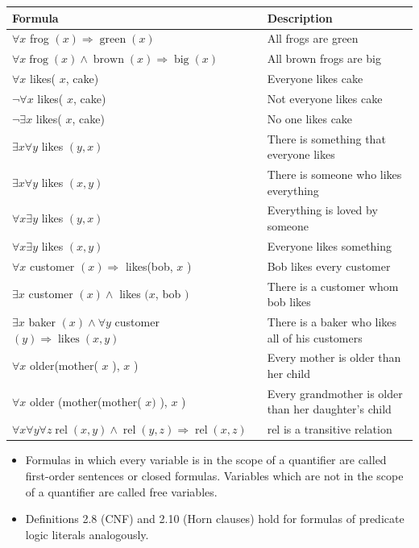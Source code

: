\documentclass[10pt]{book}
\begin{document}
\begin{center}
\begin{tabular}{|l|l|}
\hline
Formula & Description \\
\hline
$\forall x$ frog $(x) \Rightarrow \operatorname{green}(x)$ & All frogs are green \\
\hline
$\forall x \operatorname{frog}(x) \wedge \operatorname{brown}(x) \Rightarrow \operatorname{big}(x)$ & All brown frogs are big \\
\hline
$\forall x$ likes( $x$, cake) & Everyone likes cake \\
\hline
$\neg \forall x$ likes( $x$, cake) & Not everyone likes cake \\
\hline
$\neg \exists x$ likes( $x$, cake) & No one likes cake \\
\hline
$\exists x \forall y$ likes $(y, x)$ & There is something that everyone likes \\
\hline
$\exists x \forall y$ likes $(x, y)$ & There is someone who likes everything \\
\hline
$\forall x \exists y$ likes $(y, x)$ & Everything is loved by someone \\
\hline
$\forall x \exists y$ likes $(x, y)$ & Everyone likes something \\
\hline
$\forall x$ customer $(x) \Rightarrow$ likes(bob, $x$ ) & Bob likes every customer \\
\hline
$\exists x$ customer $(x) \wedge$ likes $(x$, bob $)$ & There is a customer whom bob likes \\
\hline
$\exists x$ baker $(x) \wedge \forall y$ customer $(y) \Rightarrow \operatorname{likes}(x, y)$ & There is a baker who likes all of his customers \\
\hline
$\forall x$ older(mother( $x$ ), $x$ ) & Every mother is older than her child \\
\hline
$\forall x$ older (mother(mother( $x)$ ), $x$ ) & Every grandmother is older than her daughter's child \\
\hline
$\forall x \forall y \forall z \operatorname{rel}(x, y) \wedge \operatorname{rel}(y, z) \Rightarrow \operatorname{rel}(x, z)$ & rel is a transitive relation \\
\hline
\end{tabular}
\end{center}

\begin{itemize}
  \item Formulas in which every variable is in the scope of a quantifier are called first-order sentences or closed formulas. Variables which are not in the scope of a quantifier are called free variables.
  \item Definitions 2.8 (CNF) and 2.10 (Horn clauses) hold for formulas of predicate logic literals analogously.
\end{itemize}
\end{document}
